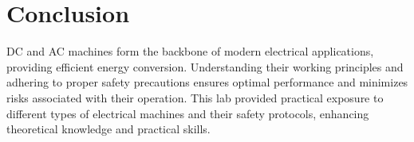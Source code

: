 \documentclass[a4paper,12pt]{article}
\begin{document}
	\section{Conclusion}
	DC and AC machines form the backbone of modern electrical applications, providing efficient energy conversion. Understanding their working principles and adhering to proper safety precautions ensures optimal performance and minimizes risks associated with their operation. This lab provided practical exposure to different types of electrical machines and their safety protocols, enhancing theoretical knowledge and practical skills.
	
	
\end{document}
